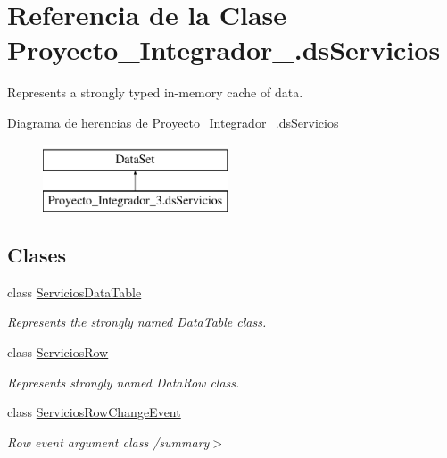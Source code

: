 \hypertarget{class_proyecto___integrador__3_1_1ds_servicios}{\section{Referencia de la Clase Proyecto\-\_\-\-Integrador\-\_.\-ds\-Servicios}
\label{class_proyecto___integrador__3_1_1ds_servicios}
}


Represents a strongly typed in-\/memory cache of data.  


Diagrama de herencias de Proyecto\-\_\-\-Integrador\-\_.\-ds\-Servicios\begin{figure}[H]
\begin{center}
\leavevmode
\includegraphics[height=2.000000cm]{class_proyecto___integrador__3_1_1ds_servicios}
\end{center}
\end{figure}
\subsection*{Clases}
\begin{DoxyCompactItemize}
\item 
class \hyperlink{class_proyecto___integrador__3_1_1ds_servicios_1_1_servicios_data_table}{Servicios\-Data\-Table}
\begin{DoxyCompactList}\small\item\em Represents the strongly named Data\-Table class. \end{DoxyCompactList}\item 
class \hyperlink{class_proyecto___integrador__3_1_1ds_servicios_1_1_servicios_row}{Servicios\-Row}
\begin{DoxyCompactList}\small\item\em Represents strongly named Data\-Row class. \end{DoxyCompactList}\item 
class \hyperlink{class_proyecto___integrador__3_1_1ds_servicios_1_1_servicios_row_change_event}{Servicios\-Row\-Change\-Event}
\begin{DoxyCompactList}\small\item\em Row event argument class /summary$>$ \end{DoxyCompactList}\end{DoxyCompactItemize}
